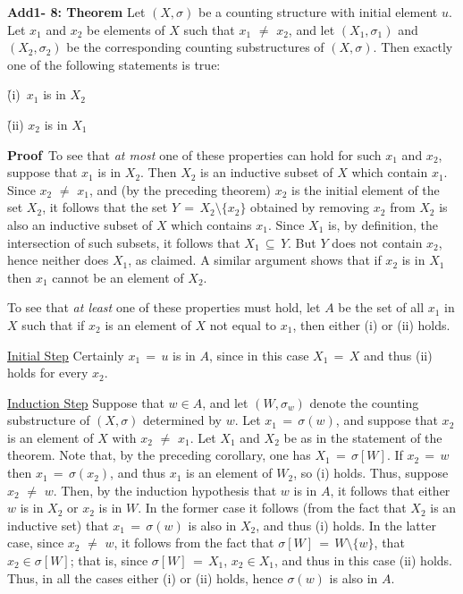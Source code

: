 {\V
\V

        {\bf Add1- 8: Theorem} Let $(X,{\sigma})$ be a counting structure with initial element $u$.
    Let $x_{1}$ and $x_{2}$ be elements of $X$ such that $x_{1} \,\,{\neq}\,\, x_{2}$, and let $(X_{1},{\sigma}_{1})$ and $(X_{2},{\sigma}_{2})$ be the corresponding counting substructures of $(X,{\sigma})$.
    Then exactly one of the following statements is true:

        \h (i)\, $x_{1}$ is in $X_{2}$

        \h (ii)  $x_{2}$ is in $X_{1}$

\V

        {\bf Proof}\,  To see that {\em at most} one of these properties can hold for such $x_{1}$ and $x_{2}$,
    suppose that $x_{1}$ is in $X_{2}$. Then $X_{2}$ is an inductive subset of $X$ which contain $x_{1}$.
    Since $x_{2} \,\,{\neq}\,\, x_{1}$, and (by the preceding theorem) $x_{2}$ is the initial element of the set $X_{2}$,
    it follows that the set $Y \,=\, X_{2}{\setminus}\{x_{2}\}$ obtained by removing $x_{2}$ from $X_{2}$ is also an inductive subset of $X$ which contains $x_{1}$.
    Since $X_{1}$ is, by definition, the intersection of such subsets, it follows that $X_{1} \,{\subseteq}\, Y$.
    But $Y$ does not contain $x_{2}$, hence neither does $X_{1}$, as claimed.
    A similar argument shows that if $x_{2}$ is in $X_{1}$ then $x_{1}$ cannot be an element of $X_{2}$.

        To see that {\em at least} one of these properties must hold, let $A$ be the set of all $x_{1}$ in $X$ such that if $x_{2}$ is an element of $X$ not equal to $x_{1}$, then either (i) or (ii) holds.

        \underline{Initial Step} Certainly $x_{1} \,=\, u$ is in $A$, since in this case $X_{1} \,=\, X$ and thus (ii) holds for every $x_{2}$.

        \underline{Induction Step} Suppose that $w{\in}A$, and let $(W,{\sigma}_{w})$ denote the counting substructure of $(X,{\sigma})$ determined by $w$.
    Let $x_{1} \,=\, {\sigma}(w)$, and suppose that $x_{2}$ is an element of $X$ with $x_{2} \,\,{\neq}\,\, x_{1}$.
    Let $X_{1}$ and $X_{2}$ be as in the statement of the theorem. Note that, by the preceding corollary, one has $X_{1} \,=\, {\sigma}[W]$.
    If $x_{2} \,=\, w$ then $x_{1} \,=\, {\sigma}(x_{2})$, and thus $x_{1}$ is an element of $W_{2}$, so (i) holds.
    Thus, suppose $x_{2} \,\,{\neq}\,\, w$.
    Then, by the induction hypothesis that $w$ is in $A$, it follows that either $w$ is in $X_{2}$ or $x_{2}$ is in $W$.
    In the former case it follows (from the fact that $X_{2}$ is an inductive set) that $x_{1} \,=\, {\sigma}(w)$ is also in $X_{2}$, and thus (i) holds.
    In the latter case, since $x_{2} \,\,{\neq}\,\, w$, it follows from the fact that ${\sigma}[W] \,=\, W{\setminus}\{w\}$, that $x_{2}{\in}{\sigma}[W]$; that is, since ${\sigma}[W] \,=\, X_{1}$, $x_{2}{\in}X_{1}$, and thus in this case (ii) holds.
    Thus, in all the cases either (i) or (ii) holds, hence ${\sigma}(w)$ is also in $A$.

}
